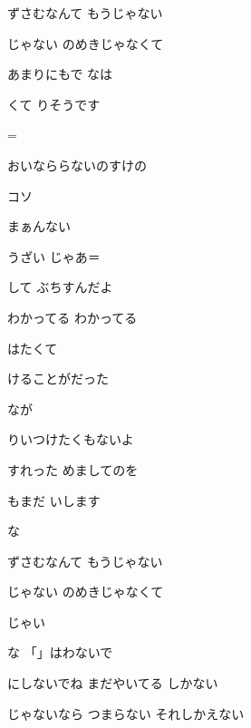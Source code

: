 \documentclass[a4paper,tate,twocolumn,12pt]{ltjtarticle}
\begin{document}
\begin{flushleft}
\begin{minipage}{\linewidth}
ずさむなんて もうじゃない

じゃない のめきじゃなくて

あまりにもで なは

くて りそうです
\end{minipage}

\vspace{2em}

\noindent\begin{minipage}{\linewidth}
=

おいなららないのすけの

コソ

まぁんない

 

うざい じゃあ＝

して ぶちすんだよ
\end{minipage}

\vspace{2em}

\noindent\begin{minipage}{\linewidth}
わかってる わかってる

はたくて

けることがだった

なが

りいつけたくもないよ
\end{minipage}

\vspace{2em}

\noindent\begin{minipage}{\linewidth}
すれった めましてのを

もまだ いします

な 

ずさむなんて もうじゃない

じゃない のめきじゃなくて

じゃい

な 「」はわないで

にしないでね まだやいてる しかない

じゃないなら つまらない それしかえない
\end{minipage}

\end{flushleft}
\end{document}
